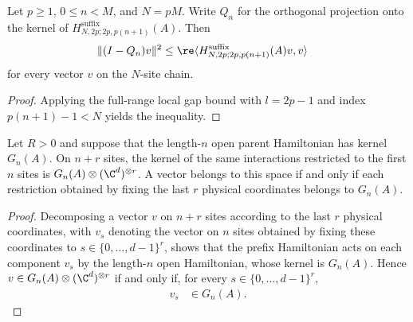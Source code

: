 \begin{lemma}
    \label{thm:grouped_open_suffix_c2}
    \leanok
    Let $p\geq1$, $0\leq n<M$, and $N=pM$. Write $Q_n$ for the
    orthogonal projection onto the kernel of
    $H^{\mathrm{suffix}}_{N,2p;2p,p(n+1)}(A)$. Then
    \begin{align}
        \lVert(I-Q_n)v\rVert^2
         & \leq\re\langle H^{\mathrm{suffix}}_{N,2p;2p,p(n+1)}(A)v,v\rangle
    \end{align}
    for every vector $v$ on the $N$-site chain.
\end{lemma}
\begin{proof}
    \leanok
    Applying the full-range local gap bound with $l=2p-1$ and index
    $p(n+1)-1<N$ yields the inequality.
\end{proof}

\begin{lemma}
    \label{thm:ph_prefix_kernel_free_right_sites}
    \leanok
    Let $R>0$ and suppose that the length-$n$ open parent Hamiltonian has
    kernel $G_n(A)$. On $n+r$ sites, the kernel of the same interactions
    restricted to the first $n$ sites is $G_n(A)\otimes(\C^d)^{\otimes r}$.
    A vector belongs to this space if and only if each restriction obtained
    by fixing the last $r$ physical coordinates belongs to $G_n(A)$.
\end{lemma}
\begin{proof}
    \leanok
    Decomposing a vector $v$ on $n+r$ sites according to the last $r$
    physical coordinates, with $v_s$ denoting the vector on $n$ sites
    obtained by fixing these coordinates to $s\in\{0,\ldots,d-1\}^r$, shows
    that the prefix Hamiltonian acts on each component $v_s$ by the length-$n$
    open Hamiltonian, whose kernel is $G_n(A)$. Hence
    $v\in G_n(A)\otimes(\C^d)^{\otimes r}$ if and only if, for every
    $s\in\{0,\ldots,d-1\}^r$,
    \begin{align}
        v_s & \in G_n(A).
    \end{align}
\end{proof}

